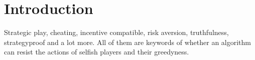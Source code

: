 


\section{Introduction}
Strategic play, cheating, incentive compatible, risk aversion, truthfulness, strategyproof and a lot more. All of them are keywords of whether an algorithm can resist the actions of selfish players and their greedyness.

